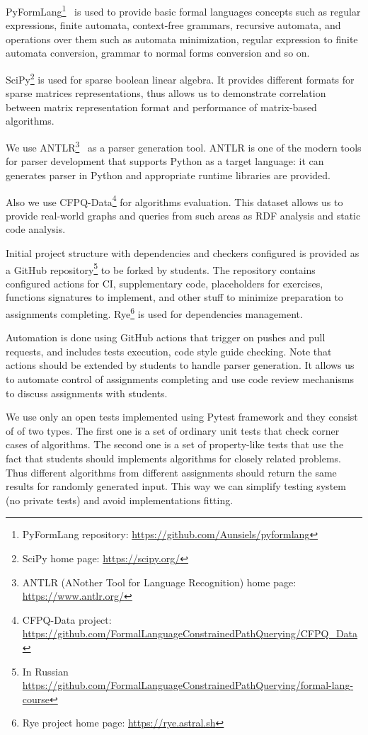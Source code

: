 \documentclass[sigconf]{acmart}
\begin{document}
PyFormLang\footnote{PyFormLang repository: \url{https://github.com/Aunsiels/pyformlang}}~\cite{10.1145/3408877.3432464} is used to provide basic formal languages concepts such as regular expressions, finite automata, context-free grammars, recursive automata, and operations over them such as automata minimization, regular expression to finite automata conversion, grammar to normal forms conversion and so on. 

SciPy\footnote{SciPy home page: \url{https://scipy.org/}} is used for sparse boolean linear algebra.
It provides different formats for sparse matrices representations, thus allows us to demonstrate correlation between matrix representation format and performance of matrix-based algorithms. 

We use ANTLR\footnote{ANTLR (ANother Tool for Language Recognition) home page: \url{https://www.antlr.org/}}~\cite{10.5555/2501720} as a parser generation tool.
ANTLR is one of the modern tools for parser development that supports Python as a target language: it can generates parser in Python and appropriate runtime libraries are provided.

Also we use CFPQ-Data\footnote{CFPQ-Data project: \url{https://github.com/FormalLanguageConstrainedPathQuerying/CFPQ_Data}} for algorithms evaluation.
This dataset allows us to provide real-world graphs and queries from such areas as RDF analysis and static code analysis. 

Initial project structure with dependencies and checkers configured is provided as a GitHub repository\footnote{In Russian \url{https://github.com/FormalLanguageConstrainedPathQuerying/formal-lang-course}} to be forked by students.
The repository contains configured actions for CI, supplementary code, placeholders for exercises, functions signatures to implement, and other stuff to minimize preparation to assignments completing.
Rye\footnote{Rye project home page: \url{https://rye.astral.sh}} is used for dependencies management.

Automation is done using GitHub actions that trigger on pushes and pull requests, and includes tests execution, code style guide checking.
Note that actions should be extended by students to handle parser generation.
It allows us to automate control of assignments completing and use code review mechanisms to discuss assignments with students.

We use only an open tests implemented using Pytest framework and they consist of of two types.
The first one is a set of ordinary unit tests that check corner cases of algorithms.
The second one is a set of property-like tests that use the fact that students should implements algorithms for closely related problems.
Thus different algorithms from different assignments should return the same results for randomly generated input. 
This way we can simplify testing system (no private tests) and avoid implementations fitting. 
\end{document}
